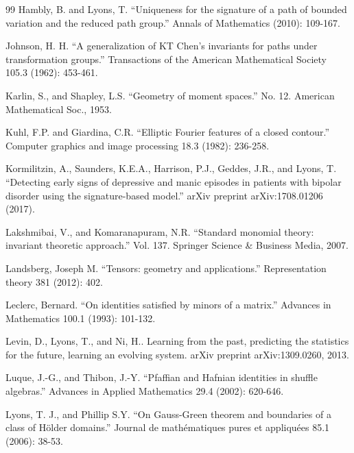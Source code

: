 \documentclass{scrartcl}
\theoremstyle{plain}
\theoremstyle{definition}
\newcommand{\1}[1]{1_{\{#1\}}}
\begin{document}
\begin{thebibliography}{99}
    Hambly, B. and Lyons, T. ``Uniqueness for the signature of a path of bounded variation and the reduced path group.'' Annals of Mathematics (2010): 109-167.

    Johnson, H. H. ``A generalization of KT Chen's invariants for paths under transformation groups.'' Transactions of the American Mathematical Society 105.3 (1962): 453-461.

    Karlin, S., and Shapley, L.S. ``Geometry of moment spaces.'' No. 12. American Mathematical Soc., 1953.

    Kuhl, F.P. and Giardina, C.R. ``Elliptic Fourier features of a closed contour.'' Computer graphics and image processing 18.3 (1982): 236-258.

    Kormilitzin, A., Saunders, K.E.A., Harrison, P.J., Geddes, J.R., and Lyons, T.
    ``Detecting early signs of depressive and manic episodes in patients with bipolar disorder using the signature-based model.'' arXiv preprint arXiv:1708.01206 (2017).

    Lakshmibai, V., and Komaranapuram, N.R. ``Standard monomial theory: invariant theoretic approach.'' Vol. 137. Springer Science \& Business Media, 2007.

    Landsberg, Joseph M. ``Tensors: geometry and applications.'' Representation theory 381 (2012): 402.

    Leclerc, Bernard. ``On identities satisfied by minors of a matrix.'' Advances in Mathematics 100.1 (1993): 101-132.
    
    Levin, D., Lyons, T., and Ni, H.. Learning from the past, predicting
    the statistics for the future, learning an evolving system. arXiv preprint
    arXiv:1309.0260, 2013.

    Luque, J.-G., and Thibon, J.-Y. ``Pfaffian and Hafnian identities in shuffle algebras.'' Advances in Applied Mathematics 29.4 (2002): 620-646.

    Lyons, T. J., and Phillip S.Y.
    ``On Gauss-Green theorem and boundaries of a class of H\"older domains.'' Journal de math\'ematiques pures et appliqu\'ees 85.1 (2006): 38-53.


\end{thebibliography}
\end{document}
